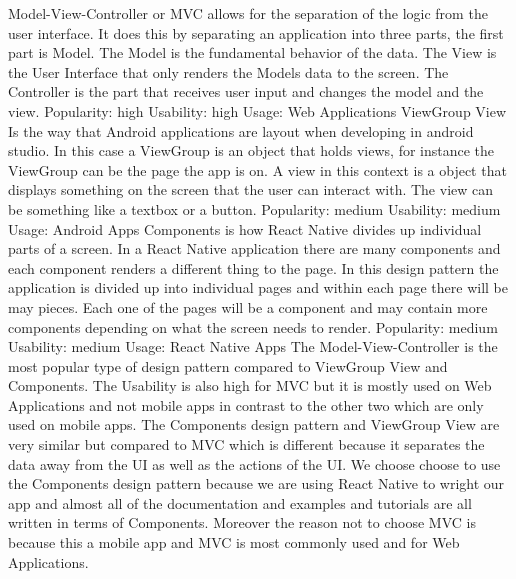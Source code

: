 \documentclass[letterpaper, 10, draftclsnofoot, onecolumn]{IEEEtran}
\begin{document}
\indent Model-View-Controller or MVC allows for the separation of the logic from the user interface. It does this by separating an application into three parts, the first part is Model. The Model is the fundamental behavior of the data. The View is the User Interface that only renders the Models data to the screen. The Controller is the part that receives user input and changes the model and the view.
\newline
\newline
Popularity: high
\newline
Usability: high
\newline
Usage: Web Applications
\newline
\newline
\indent ViewGroup View Is the way that Android applications are layout when developing in android studio. In this case a ViewGroup is an object that holds views, for instance the ViewGroup can be the page the app is on. A view in this context is a object that displays something on the screen that the user can interact with. The view can be something like a textbox or  a button.
\newline
\newline
Popularity: medium
\newline
Usability: medium
\newline
Usage: Android Apps
\newline
\newline
\indent Components is how React Native divides up individual parts of a screen. In a React Native application there are many components and each component renders a different thing to the page. In this design pattern the application is divided up into individual pages and within each page there will be may pieces. Each one of the pages will be a component and may contain more components depending on what the screen needs to render.	
\newline
\newline
Popularity: medium
\newline
Usability: medium
\newline
Usage: React Native Apps
\newline
\newline
\indent The Model-View-Controller is the most popular type of design pattern compared to ViewGroup View and Components. The Usability is also high for MVC but it is mostly used on Web Applications and not mobile apps in contrast to the other two which are only used on mobile apps. The Components design pattern and ViewGroup View are very similar but compared to MVC which is different because it separates the data away from the UI as well as the actions of the UI. 
\newline
\indent We choose choose to use the Components design pattern because we are using React Native to wright our app and almost all of the documentation and examples and tutorials are all written in terms of Components. Moreover the reason not to choose MVC is because this a mobile app and MVC is most commonly used and for Web Applications. 
\end{document}
